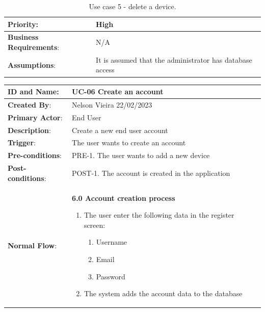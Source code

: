 \begin{table}[H]
\begin{adjustbox}{width=1.2\textwidth,center=\textwidth}
\begin{tabular}{|m{4cm}|m{12cm}|}
            \hline
            \textbf{Priority}: & High \\
            \hline
            \textbf{Business Requirements}: & N/A \\
            \hline
            \textbf{Assumptions}: & It is assumed that the administrator has database access \\
            \hline
        \end{tabular}
    \end{adjustbox}
    \vspace{1em}
    \caption{Use case 5 - delete a device.}
    \label{table:use_case5}
\end{table}

\begin{table}[H]
    \centering
    \begin{adjustbox}{width=1.2\textwidth,center=\textwidth}
        \begin{tabular}{|m{4cm}|m{12cm}|}
            \hline
            \textbf{ID and Name}: & UC-06 Create an account \\
            \hline
            \textbf{Created By}: & Nelson Vieira 22/02/2023 \\
            \hline
            \textbf{Primary Actor}: & End User \\
            \hline
            \textbf{Description}: & Create a new end user account \\
            \hline
            \textbf{Trigger}: & The user wants to create an account \\
            \hline
            \textbf{Pre-conditions}: & PRE-1. The user wants to add a new device \\
            \hline
            \textbf{Post-conditions}: & POST-1. The account is created in the application \\
            \hline
            \textbf{Normal Flow}: & \textbf{6.0 Account creation process}
            \begin{enumerate}
                \item The user enter the following data in the register screen:
                \begin{enumerate}
                    \item Username
                    \item Email
                    \item Password
                \end{enumerate}
                \item The system adds the account data to the database

\end{enumerate}
\end{tabular}
\end{adjustbox}
\end{table}
